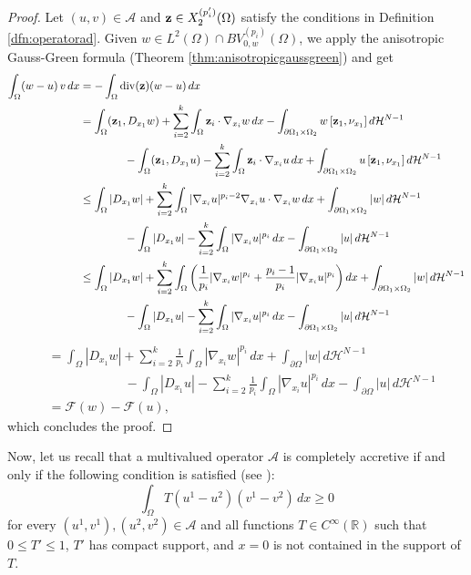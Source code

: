 \documentclass[reqno,12pt]{amsart}
\def\z{{\bf z}}
\numberwithin{equation}{section}
\begin{document}
\begin{proof}
Let $(u,v) \in \mathcal{A}$ and $\z \in X^{(p'_i)}_2(\Omega)$ satisfy the conditions in Definition \ref{dfn:operatorad}. Given $w \in L^2(\Omega) \cap BV_{0,w}^{(p_i)}(\Omega)$, we apply the anisotropic Gauss-Green formula (Theorem \ref{thm:anisotropicgaussgreen}) and get
\begin{align}
\int_\Omega (w - u) \, v \, dx &= - \int_\Omega \mathrm{div}(\z) (w - u) \, dx \\
&= \int_\Omega (\z_1, D_{x_1} w) + \sum_{i=2}^k \int_\Omega \z_i \cdot \nabla_{x_i} w \, dx - \int_{\partial\Omega_1 \times \Omega_2} w \, [\z_1, \nu_{x_1}] \,d\mathcal{H}^{N-1} \\
&\qquad\qquad - \int_\Omega (\z_1, D_{x_1} u) - \sum_{i=2}^k \int_\Omega \z_i \cdot \nabla_{x_i} u \, dx + \int_{\partial\Omega_1 \times \Omega_2} u \, [\z_1, \nu_{x_1}] \,d\mathcal{H}^{N-1} \\
&\leq \int_\Omega |D_{x_1} w| + \sum_{i=2}^k \int_\Omega |\nabla_{x_i} u|^{p_i-2} \nabla_{x_i} u \cdot \nabla_{x_i} w \, dx + \int_{\partial\Omega_1 \times \Omega_2} |w|  \,d\mathcal{H}^{N-1} \\
&\qquad\qquad - \int_\Omega |D_{x_1} u| - \sum_{i=2}^k \int_\Omega |\nabla_{x_i} u|^{p_i} \, dx - \int_{\partial\Omega_1 \times \Omega_2} |u|  \,d\mathcal{H}^{N-1} \\
&\leq \int_\Omega |D_{x_1} w| + \sum_{i=2}^k \int_\Omega \bigg( \frac{1}{p_i} |\nabla_{x_i} w|^{p_i} + \frac{p_i-1}{p_i} |\nabla_{x_i} u|^{p_i} \bigg) \, dx + \int_{\partial\Omega_1 \times \Omega_2} |w|  \,d\mathcal{H}^{N-1} \\
&\qquad\qquad - \int_\Omega |D_{x_1} u| - \sum_{i=2}^k \int_\Omega |\nabla_{x_i} u|^{p_i} \, dx - \int_{\partial\Omega_1 \times \Omega_2} |u|  \,d\mathcal{H}^{N-1}
\end{align}
\begin{align}
&= \int_\Omega |D_{x_1} w| + \sum_{i=2}^k \frac{1}{p_i} \int_\Omega |\nabla_{x_i} w|^{p_i} \, dx + \int_{\partial\Omega} |w| \, d\mathcal{H}^{N-1} \\
&\qquad\qquad\qquad -  \int_\Omega |D_{x_1} u| - \sum_{i=2}^k \frac{1}{p_i} \int_\Omega |\nabla_{x_i} u|^{p_i} \, dx - \int_{\partial\Omega} |u| \, d\mathcal{H}^{N-1} \\
&= \mathcal{F}(w) - \mathcal{F}(u),
\end{align}
which concludes the proof.
\end{proof}

Now, let us recall that a multivalued operator $\mathcal{A}$ is completely accretive if and only if the following condition is satisfied (see \cite{ACMBook,BCr2}):
\begin{equation}\label{eq:conditionforaccretivity}
\int_\Omega T(u^1 - u^2) (v^1 - v^2) \, dx \geq 0    
\end{equation}
for every $(u^1,v^1), (u^2,v^2) \in \mathcal{A}$ and all functions $T \in C^{\infty}(\mathbb{R})$ such that $0 \leq T' \leq 1$, $T'$ has compact support, and $x=0$ is not contained in the support of $T$.
\end{document}
